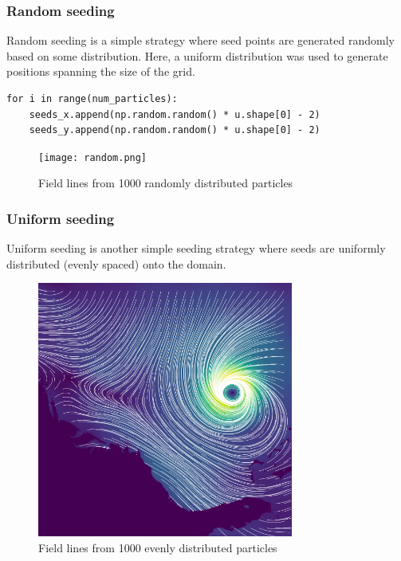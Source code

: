\documentclass{article}
\begin{document}
\subsubsection{Random seeding}
Random seeding is a simple strategy where seed points are generated randomly based on some distribution.
Here, a uniform distribution was used to generate positions spanning the size of the grid.
\begin{verbatim}
for i in range(num_particles):
    seeds_x.append(np.random.random() * u.shape[0] - 2)
    seeds_y.append(np.random.random() * u.shape[0] - 2)
\end{verbatim}

\begin{figure}[h!]
    \centering
    \texttt{[image: random.png]}
    \caption{Field lines from 1000 randomly distributed particles}
\end{figure}

\subsubsection{Uniform seeding}
Uniform seeding is another simple seeding strategy where seeds
are uniformly distributed (evenly spaced) onto the domain.
\begin{figure}[h!]
    \centering
    \includegraphics[width=0.75\textwidth, angle=270]{uniform.png}
    \caption{Field lines from 1000 evenly distributed particles}
\end{figure}
\end{document}
